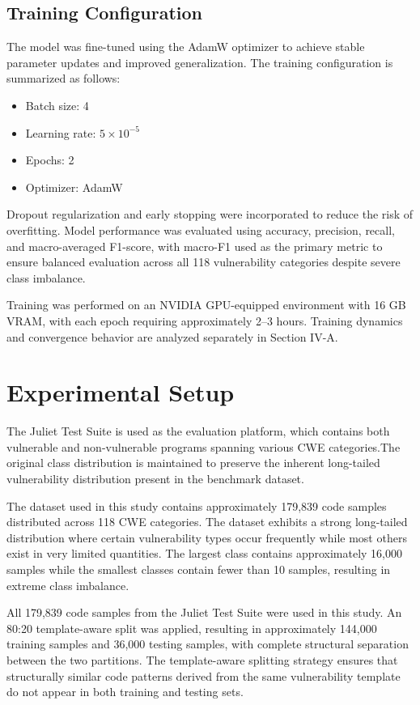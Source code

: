\documentclass[conference]{IEEEtran}
\begin{document}
\subsection{Training Configuration}

The model was fine-tuned using the AdamW optimizer to achieve stable parameter updates and improved generalization. The training configuration is summarized as follows:

\begin{itemize}
    \item Batch size: 4
    \item Learning rate: $5\times10^{-5}$
    \item Epochs: 2
    \item Optimizer: AdamW
\end{itemize}

Dropout regularization and early stopping were incorporated to reduce the risk of overfitting. Model performance was evaluated using accuracy, precision, recall, and macro-averaged F1-score, with macro-F1 used as the primary metric to ensure balanced evaluation across all 118 vulnerability categories despite severe class imbalance.

Training was performed on an NVIDIA GPU-equipped environment with 16 GB VRAM, with each epoch requiring approximately 2--3 hours. Training dynamics and convergence behavior are analyzed separately in Section IV-A.
\section{Experimental Setup}

The Juliet Test Suite is used as the evaluation platform, which contains both vulnerable and non-vulnerable programs spanning various CWE categories.The original class distribution is maintained to preserve the inherent long-tailed vulnerability distribution present in the benchmark dataset.

The dataset used in this study contains approximately 179,839 code samples distributed across 118 CWE categories. The dataset exhibits a strong long-tailed distribution where certain vulnerability types occur frequently while most others exist in very limited quantities. The largest class contains approximately 16,000 samples while the smallest classes contain fewer than 10 samples, resulting in extreme class imbalance.

All 179,839 code samples from the Juliet Test Suite were used in this study. An 80:20 template-aware split was applied, resulting in approximately 144,000 training samples and 36,000 testing samples, with complete structural separation between the two partitions. The template-aware splitting strategy ensures that structurally similar code patterns derived from the same vulnerability template do not appear in both training and testing sets.
\end{document}
